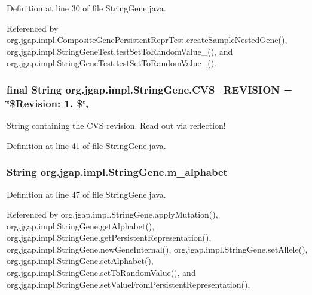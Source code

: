 Definition at line 30 of file String\-Gene.\-java.



Referenced by org.\-jgap.\-impl.\-Composite\-Gene\-Persistent\-Repr\-Test.\-create\-Sample\-Nested\-Gene(), org.\-jgap.\-impl.\-String\-Gene\-Test.\-test\-Set\-To\-Random\-Value\-\_(), and org.\-jgap.\-impl.\-String\-Gene\-Test.\-test\-Set\-To\-Random\-Value\-\_().

\hypertarget{classorg_1_1jgap_1_1impl_1_1_string_gene_a75f05ef9c33710dd3e5e03677bdc55e2}{
\subsubsection[{C\-V\-S\-\_\-\-R\-E\-V\-I\-S\-I\-O\-N}]{\setlength{\rightskip}{0pt plus 5cm}final String org.\-jgap.\-impl.\-String\-Gene.\-C\-V\-S\-\_\-\-R\-E\-V\-I\-S\-I\-O\-N = \char`\"{}\$Revision\-: 1. \$\char`\"{}\hspace{0.3cm}{\ttfamily [static]}, {\ttfamily [private]}}}\label{classorg_1_1jgap_1_1impl_1_1_string_gene_a75f05ef9c33710dd3e5e03677bdc55e2}
String containing the C\-V\-S revision. Read out via reflection! 

Definition at line 41 of file String\-Gene.\-java.

\hypertarget{classorg_1_1jgap_1_1impl_1_1_string_gene_a19600b3076454473558a6c9841f9f956}{
\subsubsection[{m\-\_\-alphabet}]{\setlength{\rightskip}{0pt plus 5cm}String org.\-jgap.\-impl.\-String\-Gene.\-m\-\_\-alphabet\hspace{0.3cm}{\ttfamily [private]}}}\label{classorg_1_1jgap_1_1impl_1_1_string_gene_a19600b3076454473558a6c9841f9f956}


Definition at line 47 of file String\-Gene.\-java.



Referenced by org.\-jgap.\-impl.\-String\-Gene.\-apply\-Mutation(), org.\-jgap.\-impl.\-String\-Gene.\-get\-Alphabet(), org.\-jgap.\-impl.\-String\-Gene.\-get\-Persistent\-Representation(), org.\-jgap.\-impl.\-String\-Gene.\-new\-Gene\-Internal(), org.\-jgap.\-impl.\-String\-Gene.\-set\-Allele(), org.\-jgap.\-impl.\-String\-Gene.\-set\-Alphabet(), org.\-jgap.\-impl.\-String\-Gene.\-set\-To\-Random\-Value(), and org.\-jgap.\-impl.\-String\-Gene.\-set\-Value\-From\-Persistent\-Representation().

